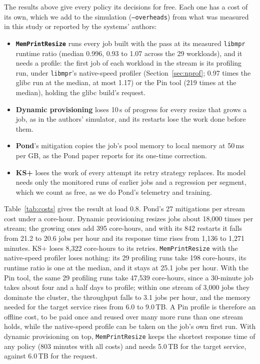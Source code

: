 \documentclass[11pt]{article}
\newcommand{\libmpr}{\texttt{libmpr}}
\newcommand{\pass}{\texttt{MemPrintResize}}
\newcommand{\secref}[1]{Section~\ref{#1}}
\newcommand{\tabref}[1]{Table~\ref{#1}}
\begin{document}
The results above give every policy its decisions for free. Each one has a cost of its own, which we add to the
simulation (\texttt{--overheads}) from what was measured in this study or reported by the systems' authors:
\begin{itemize}
  \item \textbf{\pass{}} runs every job built with the pass at its measured \libmpr{} runtime ratio (median 0.996,
    0.93 to 1.07 across the 29 workloads), and it needs a profile: the first job of each workload in the stream is
    its profiling run, under \libmpr{}'s native-speed profiler (\secref{sec:nprof}; 0.97 times the glibc run at the
    median, at most 1.17) or the Pin tool (219 times at the median), holding the glibc build's request.
  \item \textbf{Dynamic provisioning} loses 10\,s of progress for every resize that grows a job, as in the authors'
    simulator, and its restarts lose the work done before them.
  \item \textbf{Pond}'s mitigation copies the job's pool memory to local memory at 50\,ms per GB, as the Pond paper
    reports for its one-time correction.
  \item \textbf{KS+} loses the work of every attempt its retry strategy replaces. Its model needs only the monitored runs of
    earlier jobs and a regression per segment, which we count as free, as we do Pond's telemetry and training.
\end{itemize}

\tabref{tab:costs} gives the result at load 0.8. Pond's 27 mitigations per stream cost under a core-hour. Dynamic
provisioning resizes jobs about 18{,}000 times per stream; the growing ones add 395 core-hours, and with its 842
restarts it falls from 21.2 to 20.6 jobs per hour and its response time rises from 1{,}136 to 1{,}271 minutes. KS+
loses 8{,}322 core-hours to its retries. \pass{} with the native-speed profiler loses nothing: its 29 profiling runs
take 198 core-hours, its runtime ratio is one at the median, and it stays at 25.1 jobs per hour. With the Pin tool,
the same 29 profiling runs take 47{,}539 core-hours, since a 30-minute job takes about four and a half days to
profile; within one stream of 3{,}000 jobs they dominate the cluster, the throughput falls to 3.1 jobs per hour,
and the memory needed for the target service rises from 6.0 to 9.0\,TB. A Pin profile is therefore an offline cost,
to be paid once and reused over many more runs than one stream holds, while the native-speed profile can be taken
on the job's own first run. With dynamic provisioning on top, \pass{} keeps the shortest response time of any
policy (803 minutes with all costs) and needs 5.0\,TB for the target service, against 6.0\,TB for the request.
\end{document}
